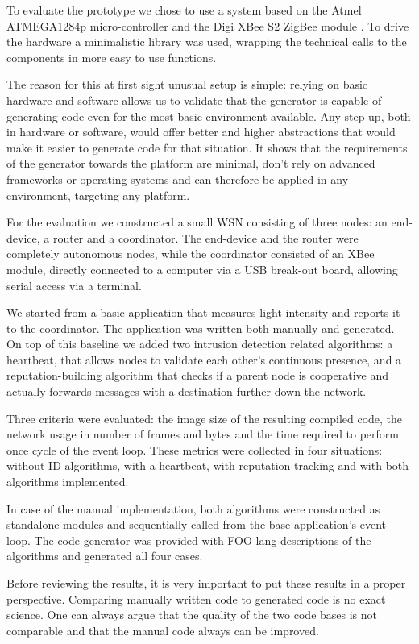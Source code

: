 \documentclass[conference]{IEEEtran}
\begin{document}
To evaluate the prototype we chose to use a system based on the Atmel
ATMEGA1284p micro-controller \cite{datasheet:atmega1284p} and the Digi XBee S2
ZigBee module \cite{manual:xbee}. To drive the hardware a minimalistic library
was used, wrapping the technical calls to the components in more easy to use
functions.

The reason for this at first sight unusual setup is simple: relying on basic
hardware and software allows us to validate that the generator is capable of
generating code even for the most basic environment available. Any step up,
both in hardware or software, would offer better and higher abstractions that
would make it easier to generate code for that situation. It shows that the
requirements of the generator towards the platform are minimal, don't rely on
advanced frameworks or operating systems and can therefore be applied in any
environment, targeting any platform.

For the evaluation we constructed a small WSN consisting of three nodes: an
end-device, a router and a coordinator. The end-device and the router were
completely autonomous nodes, while the coordinator consisted of an XBee module,
directly connected to a computer via a USB break-out board, allowing serial
access via a terminal.

We started from a basic application that measures light intensity and reports
it to the coordinator. The application was written both manually and generated.
On top of this baseline we added two intrusion detection related algorithms: a
heartbeat, that allows nodes to validate each other's continuous presence, and
a reputation-building algorithm that checks if a parent node is cooperative and
actually forwards messages with a destination further down the
network\cite{ganeriwal2008reputation}.

Three criteria were evaluated: the image size of the resulting compiled code,
the network usage in number of frames and bytes and the time required to
perform once cycle of the event loop. These metrics were collected in four
situations: without ID algorithms, with a heartbeat, with reputation-tracking
and with both algorithms implemented.

In case of the manual implementation, both algorithms were constructed as
standalone modules and sequentially called from the base-application's event
loop. The code generator was provided with FOO-lang descriptions of the
algorithms and generated all four cases.

Before reviewing the results, it is very important to put these results in a
proper perspective. Comparing manually written code to generated code is no
exact science. One can always argue that the quality of the two code bases is
not comparable and that the manual code always can be improved.
\end{document}
